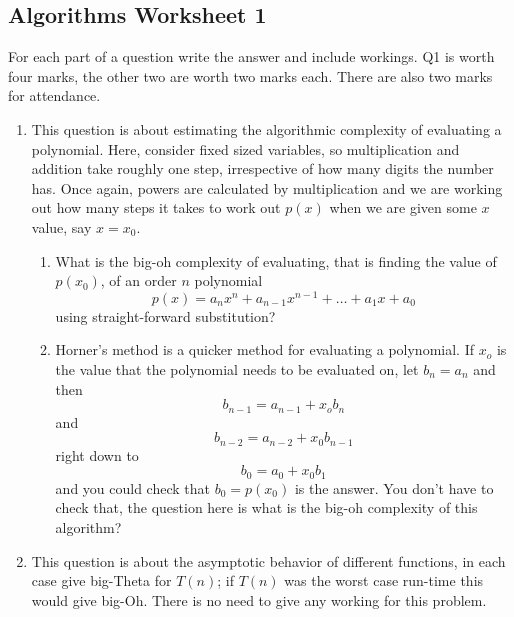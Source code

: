 \documentclass[11pt,a4paper]{scrartcl}
\newif\ifanswers
\begin{document}
\subsection*{Algorithms Worksheet 1}

For each part of a question write the answer and include workings. Q1
is worth four marks, the other two are worth two marks each. There are
also two marks for attendance.

\begin{enumerate}

\item This question is about estimating the algorithmic complexity of
  evaluating a polynomial. Here, consider fixed sized variables, so
  multiplication and addition take roughly one step, irrespective of
  how many digits the number has. Once again, powers are calculated by
  multiplication and we are working out how many steps it takes to
  work out $p(x)$ when we are given some $x$ value, say $x=x_0$.

\begin{enumerate}
\item What is the big-oh complexity of evaluating, that is finding the
  value of $p(x_0)$, of an order $n$ polynomial
$$p(x)=a_n x^n +a_{n-1}x^{n-1}+\ldots+a_1x+a_0$$
using straight-forward substitution?
\item Horner's method is a quicker method for evaluating a
  polynomial. If $x_o$ is the value that the polynomial needs to be
  evaluated on, let $b_n=a_n$ and then 
$$ b_{n-1}=a_{n-1}+x_o b_{n}$$
and
$$ b_{n-2}=a_{n-2}+x_0 b_{n-1}$$
right down to 
$$ b_0=a_0+x_0b_1$$ and you could check that $b_0=p(x_0)$ is the
answer. You don't have to check that, the question here is what is the
big-oh complexity of this algorithm?
\end{enumerate}

\ifanswers 

\noindent Solution: So calculating $x^i$ is $i-1$ multiplications, there are
faster ways to work out powers, but you are told that they are
calculated by multiplication; multiplying by $a_i$ is one more, so
that is $i$ calculations, thus evaluating the polynomial is
$1+2+3+\ldots n$ multiplications, along with $n-1$ additions; thus
this is $\Theta(n^2)$. However, using Horner's method each $b_i$ is a few calculations and there are $n$ $b_i$s, so that means it is $\Theta(n)$.

\fi

\item This question is about the asymptotic behavior of
  different functions, in each case give big-Theta for $T(n)$; if
  $T(n)$ was the worst case run-time this would give big-Oh. There is
  no need to give any working for this problem. 


\end{enumerate}
\end{document}

